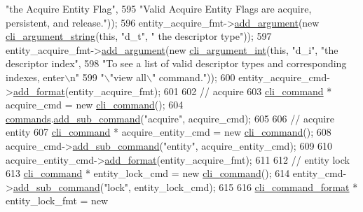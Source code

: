 \begin{DoxyCode}
{      "the Acquire Entity Flag"},
595                                                              \textcolor{stringliteral}{"Valid Acquire Entity Flags are acquire,
       persistent, and release."}));
596     entity\_acquire\_fmt->\hyperlink{classcli__command__format_ac3fc6d13a227c195d5ee6f7b78eba9cd}{add\_argument}(\textcolor{keyword}{new} \hyperlink{classcli__argument__string}{cli\_argument\_string}(\textcolor{keyword}{this}, \textcolor{stringliteral}{"d\_t"}, \textcolor{stringliteral}{"
      the descriptor type"}));
597     entity\_acquire\_fmt->\hyperlink{classcli__command__format_ac3fc6d13a227c195d5ee6f7b78eba9cd}{add\_argument}(\textcolor{keyword}{new} \hyperlink{classcli__argument__int}{cli\_argument\_int}(\textcolor{keyword}{this}, \textcolor{stringliteral}{"d\_i"}, \textcolor{stringliteral}{"the
       descriptor index"},
598                                                           \textcolor{stringliteral}{"To see a list of valid descriptor types and
       corresponding indexes, enter\(\backslash\)n"}
599                                                           \textcolor{stringliteral}{"\(\backslash\)"view all\(\backslash\)" command."}));
600     entity\_acquire\_cmd->\hyperlink{classcli__command_aa9ec38e761644d946f8db2b920e39921}{add\_format}(entity\_acquire\_fmt);
601 
602     \textcolor{comment}{// acquire}
603     \hyperlink{classcli__command}{cli\_command} * acquire\_cmd = \textcolor{keyword}{new} \hyperlink{classcli__command}{cli\_command}();
604     \hyperlink{classcmd__line_ae4fea670c2fdd2b60f7b5b6ad6fbaf1e}{commands}.\hyperlink{classcli__command_aa73a67e8ebb6facd4b40ced66279b226}{add\_sub\_command}(\textcolor{stringliteral}{"acquire"}, acquire\_cmd);
605 
606     \textcolor{comment}{// acquire entity}
607     \hyperlink{classcli__command}{cli\_command} * acquire\_entity\_cmd = \textcolor{keyword}{new} \hyperlink{classcli__command}{cli\_command}();
608     acquire\_cmd->\hyperlink{classcli__command_aa73a67e8ebb6facd4b40ced66279b226}{add\_sub\_command}(\textcolor{stringliteral}{"entity"}, acquire\_entity\_cmd);
609 
610     acquire\_entity\_cmd->\hyperlink{classcli__command_aa9ec38e761644d946f8db2b920e39921}{add\_format}(entity\_acquire\_fmt);
611 
612     \textcolor{comment}{// entity lock}
613     \hyperlink{classcli__command}{cli\_command} * entity\_lock\_cmd = \textcolor{keyword}{new} \hyperlink{classcli__command}{cli\_command}();
614     entity\_cmd->\hyperlink{classcli__command_aa73a67e8ebb6facd4b40ced66279b226}{add\_sub\_command}(\textcolor{stringliteral}{"lock"}, entity\_lock\_cmd);
615 
616     \hyperlink{classcli__command__format}{cli\_command\_format} * entity\_lock\_fmt = \textcolor{keyword}{new} 

\end{DoxyCode}
